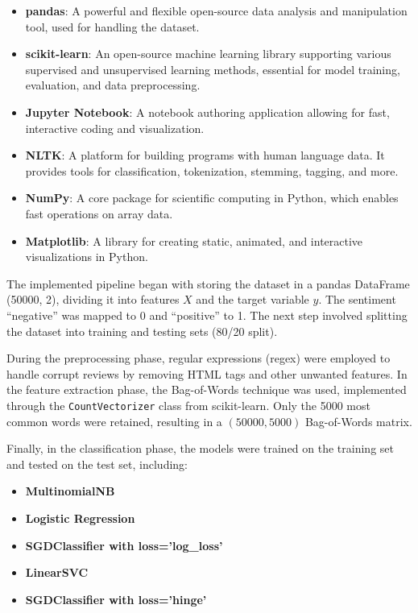 \documentclass{article}
\begin{document}
\begin{itemize}
    \item \textbf{pandas}: A powerful and flexible open-source data analysis and manipulation tool, used for handling the dataset.
    \item \textbf{scikit-learn}: An open-source machine learning library supporting various supervised and unsupervised learning methods, essential for model training, evaluation, and data preprocessing.
    \item \textbf{Jupyter Notebook}: A notebook authoring application allowing for fast, interactive coding and visualization.
    \item \textbf{NLTK}: A platform for building programs with human language data. It provides tools for classification, tokenization, stemming, tagging, and more.
    \item \textbf{NumPy}: A core package for scientific computing in Python, which enables fast operations on array data.
    \item \textbf{Matplotlib}: A library for creating static, animated, and interactive visualizations in Python.
\end{itemize}

The implemented pipeline began with storing the dataset in a pandas DataFrame (50000, 2), dividing it into features \(X\) and the target variable \(y\). The sentiment “negative” was mapped to 0 and “positive” to 1. The next step involved splitting the dataset into training and testing sets (80/20 split).

During the preprocessing phase, regular expressions (regex) were employed to handle corrupt reviews by removing HTML tags and other unwanted features. In the feature extraction phase, the Bag-of-Words technique was used, implemented through the \texttt{CountVectorizer} class from scikit-learn. Only the 5000 most common words were retained, resulting in a \( (50000, 5000) \) Bag-of-Words matrix.

Finally, in the classification phase, the models were trained on the training set and tested on the test set, including:
\begin{itemize}
    \item \textbf{MultinomialNB}
    \item \textbf{Logistic Regression}
    \item \textbf{SGDClassifier with loss='log\_loss'}
    \item \textbf{LinearSVC}
    \item \textbf{SGDClassifier with loss='hinge'}
\end{itemize}
\end{document}
